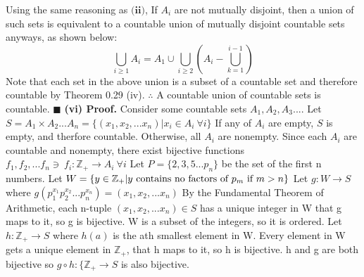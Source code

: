 \documentclass[12pt]{article}
\begin{document}
	\newline \newline
	Using the same reasoning as \(\textbf{(ii)}\), If \(A_i\) are not mutually disjoint, then a union of such sets is equivalent to a countable union of mutually disjoint countable sets anyways, as shown below:
	\[\bigcup_{i \geq 1} A_i = A_1 \cup \bigcup_{i \geq 2}\left(A_i-\bigcup_{k=1}^{i-1}\right)\]
	Note that each set in the above union is a subset of a countable set and therefore countable by Theorem 0.29 (iv). \newline
	\(\therefore\) A countable union of countable sets is countable.
	\newline \(\blacksquare\) \newline \newline
	\textbf{(vi) Proof.} Consider some countable sets \(A_1, A_2,A_3...\).
	\newline
	Let \(S = A_1\times A_2...A_n = \{(x_1,x_2,...x_n)|x_i\in A_i\ \forall i\}\)
	If any of \(A_i\) are empty, \(S\) is empty, and therfore countable.
	\newline
	Otherwise, all \(A_i\) are nonempty. Since each \(A_i\) are countable and nonempty, there exist bijective functions \(f_1,f_2,...f_n\ni\ f_i: \mathbb{Z}_+ \rightarrow A_i\ \forall i\)
	\newline \newline
	Let \(P = \{2,3,5...p_n\}\) be the set of the first n numbers.
	\newline
	Let \(W = \{y \in \mathbb{Z}_+|y \textup{ contains no factors of } p_m \textup{ if } m>n\}\)
	\newline \newline
	Let \(g: W \rightarrow S\) where \(g(p_1^{x_1}p_2^{x_2}...p_n^{x_n})=(x_1,x_2,...x_n)\)
	\newline
	By the Fundamental Theorem of Arithmetic, each n-tuple \((x_1,x_2,...x_n)\in S\) has a unique integer in W that g maps to it, so g is bijective.
	\newline \newline
	W is a subset of the integers, so it is ordered.
	\newline
	Let \(h: \mathbb{Z}_+ \rightarrow S\) where \(h(a)\) is the ath smallest element in W.
	\newline
	Every element in W gets a unique element in \(\mathbb{Z}_+\), that h maps to it, so h is bijective.
	\newline \newline
	h and g are both bijective so \(g \circ h : \{\mathbb{Z}_+ \rightarrow S\) is also bijective.
\end{document}
